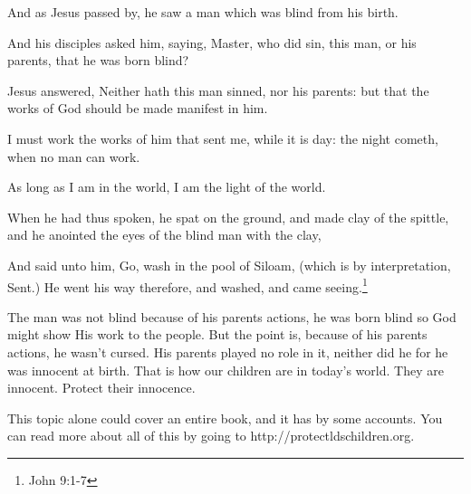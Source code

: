 \begin{displayquote}
And as Jesus passed by, he saw a man which was blind from his birth.

And his disciples asked him, saying, Master, who did sin, this man, or his parents, 
that he was born blind?

Jesus answered, Neither hath this man sinned, nor his parents: but that the works of 
God should be made manifest in him.

I must work the works of him that sent me, while it is day: the night cometh, 
when no man can work.

As long as I am in the world, I am the light of the world.

When he had thus spoken, he spat on the ground, and made clay of the spittle, 
and he anointed the eyes of the blind man with the clay,

And said unto him, Go, wash in the pool of Siloam, (which is by interpretation, 
  Sent.) He went his way therefore, and washed, and came seeing.\footnote{John 9:1-7}
\end{displayquote}

The man was not blind because of his parents actions, he was born blind so God might
show His work to the people. But the point is, because of his parents actions, he
wasn't cursed. His parents played no role in it, neither did he for he was innocent
at birth. That is how our children are in today's world. They are innocent. Protect
their innocence.

This topic alone could cover an entire book, and it has by some accounts. You can
read more about all of this by going to http://protectldschildren.org.